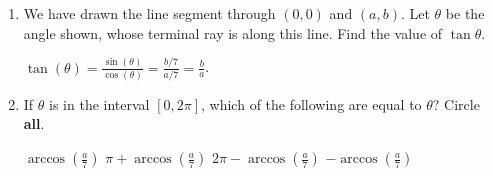 \documentclass{article}
\begin{document}
\begin{enumerate}
\begin{enumerate}
\begin{problem}[\stretch{2}]
      {\it Your answer will be in terms of $a$ and $b$.}
    \end{problem}

    \begin{solution}
      We are looking for $\dfrac{dy}{dx}$ at the point $(a, b)$.  To
      start, we need the equation of the circle, which is
      \begin{align*}
        x^2 + y^2 & = 7^2 \\
        \intertext{Now, we'll take the derivative of both sides with
          respect to $x$:} 
        2x + 2y \frac{dy}{dx} & = 0 \\
        \intertext{Next, we'll solve for $\dfrac{dy}{dx}$:}
        \frac{dy}{dx} & = -\frac{x}{y} \\
      \end{align*}
      Therefore, at the point $(a,b)$, the slope is
      $\boxed{-\frac{a}{b}}$. 
    \end{solution}

  \item
    \begin{problem}[\vfill]
      We have drawn the line segment through $(0,0)$ and $(a,b)$.  Let
      $\theta$ be the angle shown, whose terminal ray is along this line.  Find the value of $\tan \theta$.
    \end{problem}

    \begin{solution}
      $\displaystyle \tan(\theta) = \frac{\sin(\theta)}{\cos(\theta)} =
      \frac{b/7}{a/7} = \boxed{\frac{b}{a}}$.
    \end{solution}

  
  \item 
  
  If $\theta$ is in the interval $[0, 2 \pi]$, which of the
    following are equal to $\theta$?  Circle \textbf{all}.
    \begin{multicols}{2}
      \begin{enumerate}[label=\protect\maybecircle{\Alph*.}]
      \plainitem $\displaystyle \arccos \left( \frac{a}{7} \right)$
      \plainitem $\displaystyle \pi + \arccos \left( \frac{a}{7} \right)$
      \circleitem $\displaystyle 2\pi - \arccos \left( \frac{a}{7} \right)$
      \plainitem $\displaystyle - \arccos \left( \frac{a}{7} \right)$
      \end{enumerate}
    \end{multicols}


\end{enumerate}
\end{enumerate}
\end{document}
